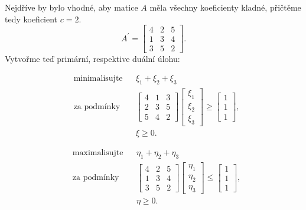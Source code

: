 Nejdříve by bylo vhodné, aby matice $A$ měla všechny koeficienty kladné, přičtěme tedy koeficient $c = 2$.
\[
    A^{\prime} = 
    \begin{bmatrix}
        4 & 2 & 5 \\
        1 & 3 & 4 \\
        3 & 5 & 2
    \end{bmatrix}.
\]
Vytvořme teď primární, respektive duální úlohu:
\begin{multicols}{2}
    \[
    \begin{aligned}
        &\text{minimalisujte}&& \xi_1 + \xi_2 + \xi_3 \\
        &\text{za podmínky}  && 
        \begin{bmatrix}
            4 & 1 & 3 \\
            2 & 3 & 5 \\
            5 & 4 & 2
        \end{bmatrix}
        \begin{bmatrix}
            \xi_1 \\ \xi_2 \\ \xi_3
        \end{bmatrix} \geq 
        \begin{bmatrix}
            1 \\ 1 \\ 1
        \end{bmatrix}, \\
        &\phantom{\text{za podmínky}}&&\xi \geq 0.
    \end{aligned}
    \]

    \[
    \begin{aligned}
        &\text{maximalisujte}&& \eta_1 + \eta_2 + \eta_3 \\
        &\text{za podmínky}  && 
        \begin{bmatrix}
            4 & 2 & 5 \\
            1 & 3 & 4 \\
            3 & 5 & 2
        \end{bmatrix}
        \begin{bmatrix}
            \eta_1 \\ \eta_2 \\ \eta_3
        \end{bmatrix} \leq 
        \begin{bmatrix}
            1 \\ 1 \\ 1
        \end{bmatrix}, \\
        &\phantom{\text{za podmínky}}&&\eta \geq 0.
    \end{aligned}
    \]
\end{multicols}
